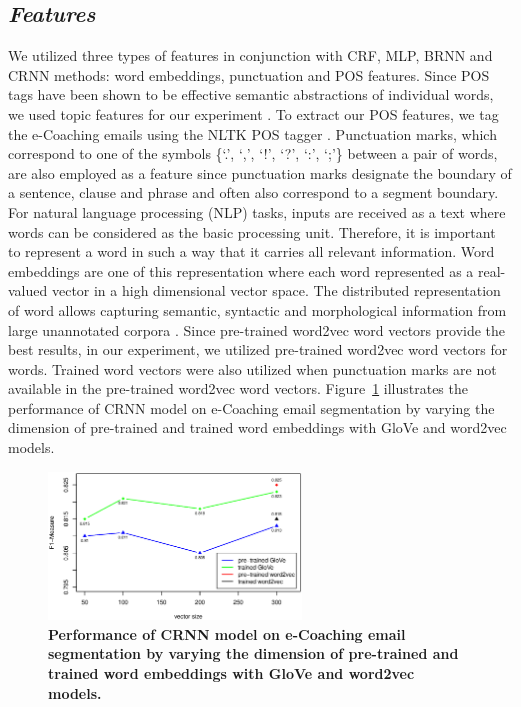 \documentclass{amia}
\begin{document}
\subsection*{\textit{Features}}

We utilized three types of features in conjunction with CRF, MLP, BRNN and CRNN methods: word embeddings, punctuation and POS features. Since POS tags have been shown to be effective semantic abstractions of individual words, we used topic features for our experiment \cite{liu2005using,treviso2017sentence}. To extract our POS features, we tag the e-Coaching emails using the NLTK POS tagger \cite{bird2009natural}. Punctuation marks, which correspond to one of the symbols \{`.', `,', `!', `?', `:', `;'\} between a pair of words, are also employed as a feature since punctuation marks designate the boundary of a sentence, clause and phrase and often also correspond to a segment boundary. For natural language processing (NLP) tasks, inputs are received as a text where words can be considered as the basic processing unit. Therefore, it is important to represent a word in such a way that it carries all relevant information. Word embeddings are one of this representation where each word represented as a real-valued vector in a high dimensional vector space. The distributed representation of word allows capturing semantic, syntactic and morphological information from large unannotated corpora  \cite{pennington2014glove, mikolov2013distributed}. Since pre-trained word2vec word vectors provide the best results, in our experiment, we utilized pre-trained word2vec word vectors for words. Trained word vectors were also utilized when punctuation marks are not available in the pre-trained word2vec word vectors. Figure~\ref{fig:embedding-dimension} illustrates the performance of CRNN model on e-Coaching email segmentation by varying the dimension of pre-trained and trained word embeddings with GloVe and word2vec models. 

\begin{figure}[!htb]
    \centering
    \includegraphics[width=0.6\textwidth]{figures/embedding-dimension.eps}
    \caption{\textbf{Performance of CRNN model on e-Coaching email segmentation by varying the dimension of pre-trained and trained word embeddings with GloVe and word2vec models.}}
    \label{fig:embedding-dimension}
\end{figure}   
\end{document}
